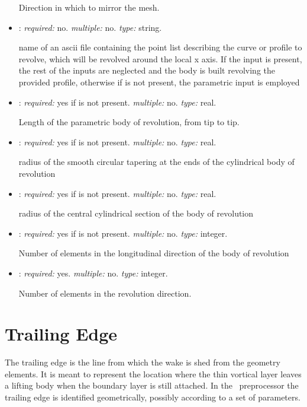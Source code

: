 \begin{itemize}
Direction in which to mirror the mesh.

\item {}: \textit{required:} no. \textit{multiple:} no. 
\textit{type:} string.

name of an ascii file containing the point list describing the 
curve or profile to revolve, which will be revolved around the local x axis. 
If the input is present, the rest of the inputs are neglected and the body is 
built revolving the provided profile, otherwise if   is not present, 
the parametric input is employed

\item {}: \textit{required:} yes if  is not present. 
\textit{multiple:} no. \textit{type:} real.

Length of the parametric body of revolution, from tip to tip.

\item {}: \textit{required:} yes if  is not present. 
\textit{multiple:} no. \textit{type:} real.

radius of the smooth circular tapering at the ends of the cylindrical body of revolution

\item {}: \textit{required:} yes if  is not present. 
\textit{multiple:} no. \textit{type:} real.

radius of the central cylindrical section of the body of revolution

\item {}: \textit{required:} yes if  is not present. 
\textit{multiple:} no. \textit{type:} integer.

Number of elements in the longitudinal direction of the body of revolution

\item {}: \textit{required:} yes. \textit{multiple:} no. 
\textit{type:} integer.

Number of elements in the revolution direction. 


\end{itemize}


\section{Trailing Edge}
\label{sec:TrailingEdge}

The trailing edge is the line from which the wake is shed from the geometry elements. 
It is meant to represent the location where the thin vortical layer leaves a lifting 
body when the boundary layer is still attached. In the \DUST \ preprocessor the 
trailing edge is identified geometrically, possibly according to a set of parameters. 

